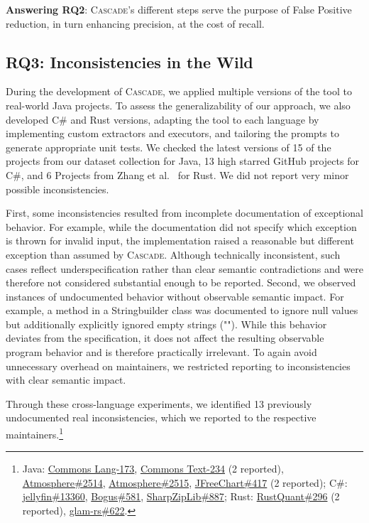 \documentclass[acmsmall, screen]{acmart}
\newcommand{\tool}{\textsc{Cascade}\xspace}
\begin{document}
\begin{tcolorbox}[mystyle]
\textbf{Answering RQ2}: \tool's different steps serve the purpose of False Positive reduction, in turn enhancing precision, at the cost of recall.
\end{tcolorbox}


\subsection{RQ3: Inconsistencies in the Wild}
During the development of \tool, we applied multiple versions of the tool to real-world Java projects. To assess the generalizability of our approach, we also developed C\# and Rust versions, adapting the tool to each language by implementing custom extractors and executors, and tailoring the prompts to generate appropriate unit tests. 
We checked the latest versions of 15 of the projects from our dataset collection for Java, 13 high starred GitHub projects for C\#, and 6 Projects from Zhang et al.~\cite{rustc4} for Rust.
We did not report very minor possible inconsistencies. 

First, some inconsistencies resulted from incomplete documentation of exceptional behavior. For example, while the documentation did not specify which exception is thrown for invalid input, the implementation raised a reasonable but different exception than assumed by \tool. Although technically inconsistent, such cases reflect underspecification rather than clear semantic contradictions and were therefore not considered substantial enough to be reported.
Second, we observed instances of undocumented behavior without observable semantic impact. For example, a method in a Stringbuilder class was documented to ignore null values but additionally explicitly ignored empty strings (""). While this behavior deviates from the specification, it does not affect the resulting observable program behavior and is therefore practically irrelevant.
To again avoid unnecessary overhead on maintainers, we restricted reporting to inconsistencies with clear semantic impact.


Through these cross-language experiments, we identified 13 previously undocumented real inconsistencies, which we reported to the respective maintainers.\footnote{
Java:
\href{https://issues.apache.org/jira/browse/LANG-173}{Commons Lang-173}, 
\href{https://issues.apache.org/jira/browse/TEXT-234}{Commons Text-234} (2 reported), 
\href{https://github.com/Atmosphere/atmosphere/issues/2514}{Atmosphere\#2514}, 
\href{https://github.com/Atmosphere/atmosphere/issues/2515 }{Atmosphere\#2515}, 
\href{https://github.com/jfree/jfreechart/issues/417}{JFreeChart\#417} (2 reported); 
C\#: 
\href{https://github.com/jellyfin/jellyfin/pull/13360}{jellyfin\#13360}, 
\href{https://github.com/bchavez/Bogus/issues/581}{Bogus\#581}, 
\href{https://github.com/icsharpcode/SharpZipLib/issues/887}{SharpZipLib\#887}; 
Rust: 
\href{https://github.com/avhz/RustQuant/pull/296}{RustQuant\#296} (2 reported),
\href{https://github.com/bitshifter/glam-rs/issues/622}{glam-rs\#622}.}  
\end{document}

